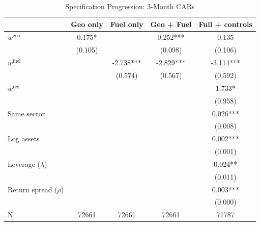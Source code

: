 \begin{table}[!htbp]
\centering
\caption{Specification Progression: 3-Month CARs}
\label{tab:spec_progression}
\begin{tabular}{lcccc}
\toprule
 & Geo only & Fuel only & Geo + Fuel & Full + controls \\
\midrule
$w^{\mathrm{geo}}$ & 0.175* &  & 0.252*** & 0.135 \\
 & (0.105) &  & (0.098) & (0.106) \\
$w^{\mathrm{fuel}}$ &  & -2.738*** & -2.829*** & -3.114*** \\
 &  & (0.574) & (0.567) & (0.592) \\
$w^{\mathrm{reg}}$ &  &  &  & 1.733* \\
 &  &  &  & (0.958) \\
Same sector &  &  &  & 0.026*** \\
 &  &  &  & (0.008) \\
Log assets &  &  &  & 0.002*** \\
 &  &  &  & (0.001) \\
Leverage ($\lambda$) &  &  &  & 0.024** \\
 &  &  &  & (0.011) \\
Return spread ($\rho$) &  &  &  & 0.003*** \\
 &  &  &  & (0.000) \\
\midrule
N & 72661 & 72661 & 72661 & 71787 \\
\bottomrule
\end{tabular}
\end{table}